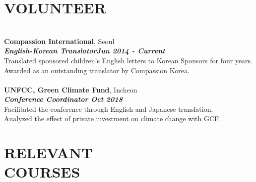 \documentclass[margin]{res}
\begin{document}
\begin{resume}
\section{VOLUNTEER}
\par
\\
{\textbf{Compassion International}, Seoul}\\
{\sl\textbf{English-Korean Translator\hfill Jun 2014 - Current}}\\
Translated sponsored children’s English letters to Korean Sponsors for four years.\\
Awarded as an outstanding translator by Compassion Korea.\\
\\{\textbf{UNFCC, Green Climate Fund}, Incheon}\\
{\sl\textbf{Conference Coordinator \hfill Oct 2018}}\\
Facilitated the conference through English and Japanese translation.\\
Analyzed the effect of private investment on climate change with GCF.


\section{RELEVANT\\COURSES}
\par





\end{resume}
\(\)
\end{document}
